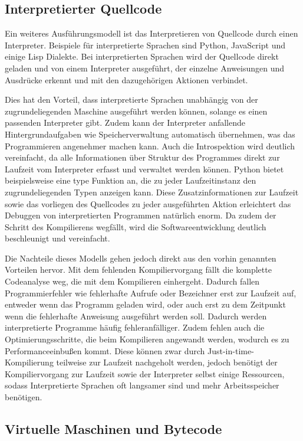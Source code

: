 \documentclass[11pt, parskip=half]{scrartcl}       %
\begin{document}
\subsection{Interpretierter Quellcode}

Ein weiteres Ausführungsmodell ist das Interpretieren von Quellcode durch einen Interpreter.
Beispiele für interpretierte Sprachen sind Python, JavaScript und einige Lisp Dialekte.
Bei interpretierten Sprachen wird der Quellcode direkt geladen und von einem Interpreter ausgeführt, der einzelne Anweisungen und Ausdrücke erkennt und mit den dazugehörigen Aktionen verbindet.

Dies hat den Vorteil, dass interpretierte Sprachen unabhängig von der zugrundeliegenden Maschine ausgeführt werden können, solange es einen passenden Interpreter gibt.
Zudem kann der Interpreter anfallende Hintergrundaufgaben wie Speicherverwaltung automatisch übernehmen, was das Programmieren angenehmer machen kann.
Auch die Introspektion wird deutlich vereinfacht, da alle Informationen über Struktur des Programmes direkt zur Laufzeit vom Interpreter erfasst und verwaltet werden können.
Python bietet beispielsweise eine type Funktion an, die zu jeder Laufzeitinstanz den zugrundeliegenden Typen anzeigen kann.
Diese Zusatzinformationen zur Laufzeit sowie das vorliegen des Quellcodes zu jeder ausgeführten Aktion erleichtert das Debuggen von interpretierten Programmen natürlich enorm.
Da zudem der Schritt des Kompilierens wegfällt, wird die Softwareentwicklung deutlich beschleunigt und vereinfacht.

Die Nachteile dieses Modells gehen jedoch direkt aus den vorhin genannten Vorteilen hervor.
Mit dem fehlenden Kompiliervorgang fällt die komplette Codeanalyse weg, die mit dem Kompilieren einhergeht.
Dadurch fallen Programmierfehler wie fehlerhafte Aufrufe oder Bezeichner erst zur Laufzeit auf, entweder wenn das Programm geladen wird, oder auch erst zu dem Zeitpunkt wenn die fehlerhafte Anweisung ausgeführt werden soll.
Dadurch werden interpretierte Programme häufig fehleranfälliger.
Zudem fehlen auch die Optimierungsschritte, die beim Kompilieren angewandt werden, wodurch es zu Performanceeinbußen kommt.
Diese können zwar durch Just-in-time-Kompilierung teilweise zur Laufzeit nachgeholt werden, jedoch benötigt der Kompiliervorgang zur Laufzeit sowie der Interpreter selbst einige Ressourcen, sodass Interpretierte Sprachen oft langsamer sind und mehr Arbeitsspeicher benötigen.

\subsection{Virtuelle Maschinen und Bytecode}
\end{document}
